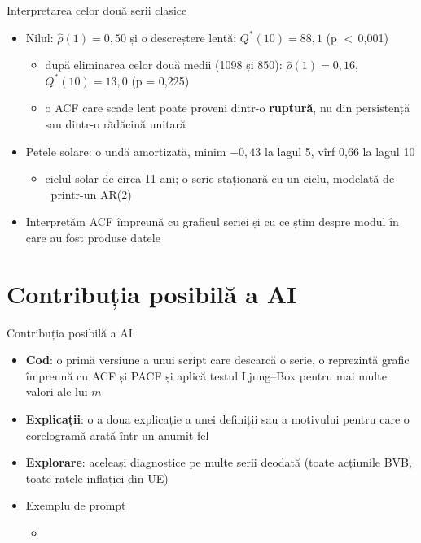 \begin{frame}{Interpretarea celor două serii clasice}
\itemsize{\small}
\begin{itemize}
    \item Nilul: $\hat\rho(1) = 0{,}50$ și o descreștere lentă; $Q^*(10) = 88{,}1$ (p $<$\,0{,}001)
    \begin{itemize}
        \item după eliminarea celor două medii (1098 și 850): $\hat\rho(1) = 0{,}16$, $Q^*(10) = 13{,}0$ (p = 0{,}225)
        \item o ACF care scade lent poate proveni dintr-o \textbf{ruptură}, nu din persistență sau dintr-o rădăcină unitară
    \end{itemize}
    \item Petele solare: o undă amortizată, minim $\ensuremath{-}0{,}43$ la lagul 5, vîrf 0{,}66 la lagul 10
    \begin{itemize}
        \item ciclul solar de circa 11 ani; o serie staționară cu un ciclu, modelată de \ printr-un AR(2)
    \end{itemize}
    \item Interpretăm ACF împreună cu graficul seriei și cu ce știm despre modul în care au fost produse datele
\end{itemize}
\end{frame}


\section{Contribuția posibilă a AI}

\begin{frame}{Contribuția posibilă a AI}
\itemsize{\small}
\begin{itemize}
    \item \textbf{Cod}: o primă versiune a unui script care descarcă o serie, o reprezintă grafic împreună cu ACF și PACF și aplică testul Ljung--Box pentru mai multe valori ale lui $m$
    \item \textbf{Explicații}: o a doua explicație a unei definiții sau a motivului pentru care o corelogramă arată într-un anumit fel
    \item \textbf{Explorare}: aceleași diagnostice pe multe serii deodată (toate acțiunile BVB, toate ratele inflației din UE)
    \item Exemplu de prompt
    \begin{itemize}
        \item {}
    \end{itemize}
\end{itemize}
\end{frame}

